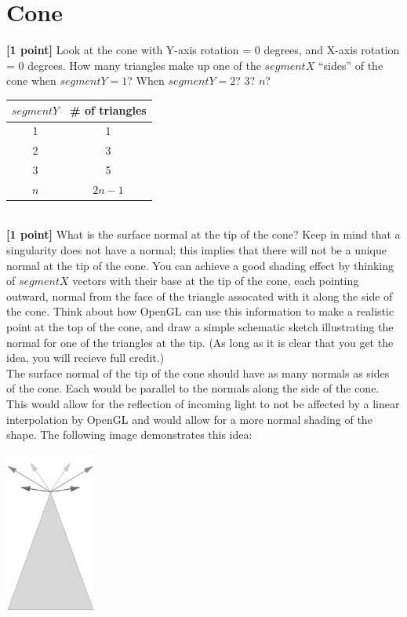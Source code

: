 \documentclass[10pt,twocolumn]{article}
\begin{document}
\section{Cone}
{\bf [1 point]} Look at the cone with Y-axis rotation = 0 degrees, and X-axis rotation = 0 degrees. How many triangles make up one of the $segmentX$ ``sides'' of the cone when $segmentY=1$? When $segmentY=2$? 3? $n$? \newline \newline
\begin{tabular}{c|c}
$segmentY$ & \# of triangles \\ \hline
1 & 1 \\
2 & 3 \\
3 & 5 \\
$n$ & $2n - 1$
\end{tabular}
\vspace{2em}\\
{\bf [1 point]} What is the surface normal at the tip of the cone? Keep in mind that a singularity does not have a normal; this implies that there will not be a unique normal at the tip of the cone. You can achieve a good shading effect by thinking of $segmentX$ vectors with their base at the tip of the cone, each pointing outward, normal from the face of the triangle assocated with it along the side of the cone. Think about how OpenGL can use this information to make a realistic point at the top of the cone, and draw a simple schematic sketch illustrating the normal for one of the triangles at the tip. (As long as it is clear that you get the idea, you will recieve full credit.)
\vspace{2em}\\
The surface normal of the tip of the cone should have as many normals as sides of the cone. Each would be parallel to the normals along the side of the cone. This would allow for the reflection of incoming light to not be affected by a linear interpolation by OpenGL and would allow for a more normal shading of the shape. The following image demonstrates this idea: \\
\begin{center}
\includegraphics[width=8em]{graphicshw1cone} \\
\end{center}
\end{document}
